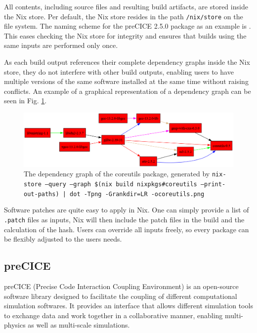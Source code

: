 \documentclass{eceasst}
\begin{document}
All contents, including source files and resulting build artifacts, are stored inside the Nix store.
Per default, the Nix store resides in the path \texttt{/nix/store} on the file system.
The naming scheme for the preCICE 2.5.0 package as an example is .
This eases checking the Nix store for integrity and ensures that builds using the same inputs are performed only once.

As each build output references their complete dependency graphs inside the Nix store, they do not interfere with other build outputs, enabling users to have multiple versions of the same software installed at the same time without raising conflicts.
An example of a graphical representation of a dependency graph can be seen in Fig. \ref{fig:nix-graph}.

\begin{figure}
    \centering
    \includegraphics[width=1\textwidth]{figures/coreutils.png}
    \caption{The dependency graph of the coreutils package, generated by \texttt{nix-store --query --graph \$(nix build nixpkgs\#coreutils --print-out-paths) | dot -Tpng -Grankdir=LR -ocoreutils.png}}
    \label{fig:nix-graph}
\end{figure}


Software patches are quite easy to apply in Nix.
One can simply provide a list of \texttt{.patch} files as inputs, Nix will then include the patch files in the build and the calculation of the hash.
Users can override all inputs freely, so every package can be flexibly adjusted to the users needs.


\subsection{preCICE}

preCICE (Precise Code Interaction Coupling Environment) is an open-source software library designed to facilitate the coupling of different computational simulation softwares.
It provides an interface that allows different simulation tools to exchange data and work together in a collaborative manner, enabling multi-physics as well as multi-scale simulations.
\end{document}
